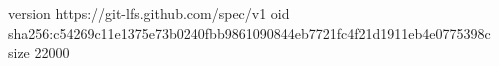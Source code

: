 version https://git-lfs.github.com/spec/v1
oid sha256:c54269c11e1375e73b0240fbb9861090844eb7721fc4f21d1911eb4e0775398c
size 22000
